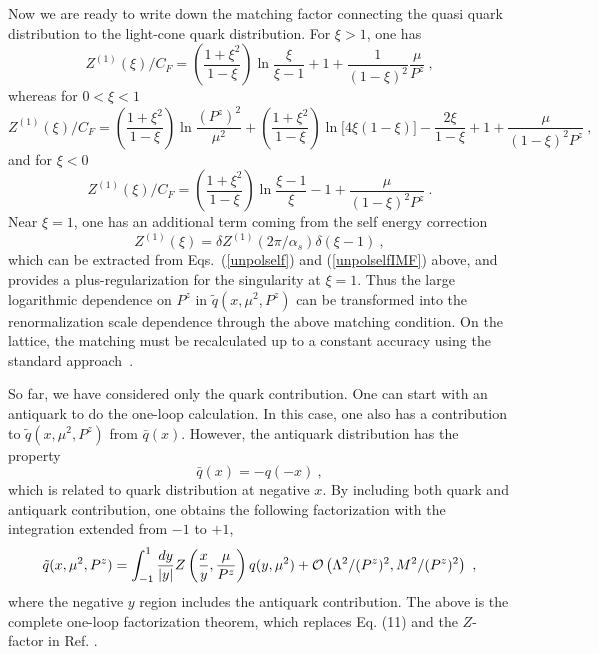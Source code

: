 Now we are ready to write down the matching factor connecting the quasi quark distribution to the light-cone quark distribution. For $\xi>1$, one has
\begin{equation}
   Z^{(1)}(\xi)/C_F = \left(\frac{1+\xi^2}{1-\xi}\right)\ln \frac{\xi}{\xi-1} + 1 + \frac{1}{(1-\xi)^2}\frac{\mu}{P^z}  \ ,
\end{equation}
whereas for $0<\xi<1$
\begin{equation}
   Z^{(1)}(\xi)/C_F = \left(\frac{1+\xi^2}{1-\xi}\right)\ln \frac{(P^z)^2}{\mu^2}+\left(\frac{1+\xi^2}{1-\xi}\right)\ln\big[{4\xi(1-\xi)}\big]-\frac{2\xi}{1-\xi}+1+\frac{\mu}{(1-\xi)^2P^z} \ ,
\end{equation}
and for $\xi<0$
\begin{equation}
   Z^{(1)}(\xi)/C_F = \left(\frac{1+\xi^2}{1-\xi}\right)\ln \frac{\xi-1}{\xi}-1 +\frac{\mu}{(1-\xi)^2P^z} \ .
\end{equation}
Near $\xi=1$, one has an additional term coming from the self energy correction
\begin{equation}
    Z^{(1)}(\xi) = \delta Z^{(1)}(2\pi/\alpha_s) \delta(\xi-1)\ ,
\end{equation}
which can be extracted from Eqs.~(\ref{unpolself}) and (\ref{unpolselfIMF}) above, and provides a plus-regularization for the singularity at $\xi=1$. Thus the large logarithmic dependence on $P^z$ in $\tilde q(x,\mu^2,P^z)$ can be transformed into the
renormalization scale dependence through the above matching condition.
On the lattice, the matching must be recalculated up to a constant accuracy
using the standard approach~\cite{ren}.

So far, we have considered only the quark contribution. One can start with an antiquark to do the one-loop
calculation. In this case, one also has a contribution to $\tilde q(x, \mu^2, P^z)$ from $\bar q(x)$. However,
the antiquark distribution has the property
\begin{equation}
     \bar q(x) = - q(-x)\ ,
\end{equation}
which is related to quark distribution at negative $x$.
By including both quark and antiquark contribution, one obtains the following factorization with the integration extended from $-1$ to $+1$,
\begin{equation}\label{1loopfact}
    \tilde q(x, \mu^2, P^z)  = \int^1_{-1} \frac{dy}{|y|} Z\left(\frac{x}{y},\frac{\mu}{P^z}\right) q(y, \mu^2) +  {\cal O}\left(\Lambda^2/(P^z)^2,  M^2/(P^z)^2\right)\ ,
\end{equation}
where the negative $y$ region includes the antiquark contribution. The above is the complete one-loop factorization theorem, which replaces
Eq. (11) and the $Z$-factor in Ref. \cite{Ji:2013dva}.


